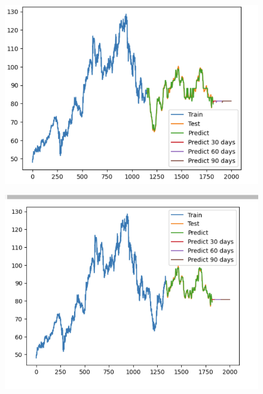 \documentclass[conference]{IEEEtran}
\begin{document}
\begin{figure}[H]
    \centering
    \begin{minipage}{0.15\textwidth}
    \centering
    \includegraphics[width=1\textwidth]{Image/Light GBM/LightGBM_SONY_6_4.png}
   
    \label{fig:1}
    \end{minipage}%
    \begin{minipage}{0.15\textwidth}
    \centering
    \includegraphics[width=1\textwidth]{Image/Light GBM/Lightgbm_SONY_7_3.png}
  

\end{minipage}
\end{figure}
\end{document}
